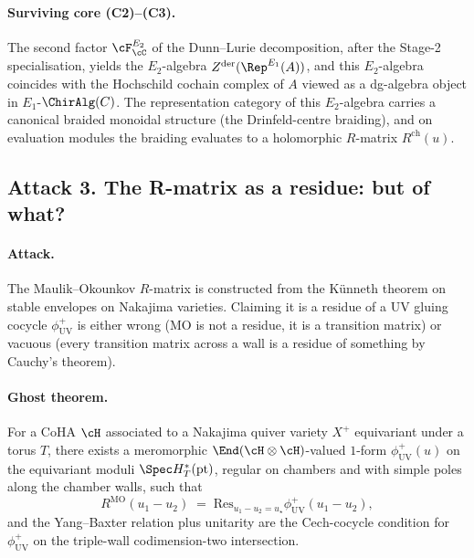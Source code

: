 \paragraph{Surviving core (C2)--(C3).}  The second factor
$\cF^{E_2}_\cC$ of the Dunn--Lurie decomposition, after the Stage-2
specialisation, yields the $E_2$-algebra $Z^{\mathrm{der}}(\Rep^{E_1}
(A))$, and this $E_2$-algebra coincides with the Hochschild cochain
complex of $A$ viewed as a dg-algebra object in
$E_1$-$\ChirAlg(C)$.  The representation category of this $E_2$-algebra
carries a canonical braided monoidal structure (the Drinfeld-centre
braiding), and on evaluation modules the braiding evaluates to a
holomorphic $R$-matrix $R^{\mathrm{ch}}(u)$.


\subsection*{Attack 3.  The R-matrix as a residue: but of what?}

\paragraph{Attack.}  The Maulik--Okounkov $R$-matrix is constructed
from the K\"unneth theorem on stable envelopes on Nakajima varieties.
Claiming it is a residue of a UV gluing cocycle $\phi^+_{\mathrm{UV}}$
is either wrong (MO is not a residue, it is a transition matrix) or
vacuous (every transition matrix across a wall is a residue of
something by Cauchy's theorem).

\paragraph{Ghost theorem.}  For a CoHA $\cH$ associated to a
Nakajima quiver variety $X^+$ equivariant under a torus $T$, there
exists a meromorphic $\End(\cH \otimes \cH)$-valued $1$-form
$\phi^+_{\mathrm{UV}}(u)$ on the equivariant moduli
$\Spec H^*_T(\mathrm{pt})$, regular on chambers and with simple poles
along the chamber walls, such that
\[
 R^{\mathrm{MO}}(u_1 - u_2)
 \;=\;
 \mathrm{Res}_{u_1 - u_2 = u_\star}
 \phi^+_{\mathrm{UV}}(u_1 - u_2),
\]
and the Yang--Baxter relation plus unitarity are the
$\mathrm{Cech}$-cocycle condition for $\phi^+_{\mathrm{UV}}$ on the
triple-wall codimension-two intersection.

